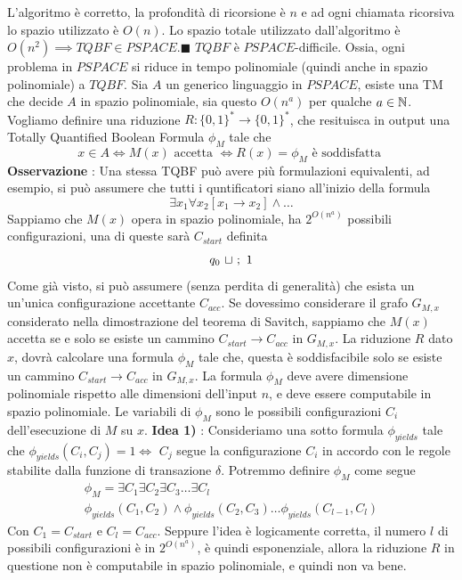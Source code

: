 \documentclass[10pt, letterpaper]{report}
\begin{document}
L'algoritmo è corretto, la profondità di ricorsione è $n$ e ad ogni chiamata ricorsiva lo spazio utilizzato è $O(n)$. Lo spazio totale utilizzato dall'algoritmo è $O(n^2)\implies TQBF\in PSPACE$.\hfill$\blacksquare$\acc 
\teo{} $TQBF$ è $PSPACE$-difficile. Ossia, ogni problema in $PSPACE$ si riduce in tempo polinomiale (quindi anche in spazio polinomiale) a $TQBF$.\acc 
\dimo{} Sia $A$ un generico linguaggio in $PSPACE$, esiste una TM che decide $A$ in spazio polinomiale, sia questo $O(n^a)$ per qualche $a\in {\mathbb N}$. Vogliamo definire una riduzione $R : \{0,1\}^*\rightarrow \{0,1\}^*$, che resituisca in output una Totally Quantified Boolean Formula $\phi_M$ tale che 
$$ x\in A \iff M(x)\text{ accetta }\iff R(x)=\phi_M \text{ è soddisfatta }$$
\textbf{Osservazione} : Una stessa TQBF può avere più formulazioni equivalenti, ad esempio, si può assumere che tutti i quntificatori siano all'inizio della formula 
$$ \exists x_1 \forall x_2 [x_1\rightarrow x_2]\land \dots$$
Sappiamo che $M(x)$ opera in spazio polinomiale, ha $2^{O(n^a)}$ possibili configurazioni, una di queste sarà $C_{start}$ definita $$ q_0 \ {\sqcup} \ ; \  1$$
Come già visto, si può assumere (senza perdita di generalità) che esista un un'unica configurazione accettante $C_{acc}$.\acc 
Se dovessimo considerare il grafo $G_{M,x}$ considerato nella dimostrazione del teorema di Savitch, sappiamo che $M(x)$ accetta se e solo se esiste un cammino $C_{start}\longrightarrow C_{acc}$ in $G_{M,x}$.\acc 
La riduzione $R$ dato $x$, dovrà calcolare una formula $\phi_M$ tale che, questa è soddisfacibile solo se esiste un cammino $C_{start}\longrightarrow C_{acc}$ in $G_{M,x}$. La formula $\phi_M$ deve avere dimensione polinomiale rispetto alle dimensioni dell'input $n$, e deve essere computabile in spazio polinomiale.\acc 
Le variabili di $\phi_M$ sono le possibili configurazioni $C_i$ dell'esecuzione di $M$ su $x$.\acc 
\textbf{Idea 1)} : Consideriamo una sotto formula $\phi_{yields}$ tale che  $\phi_{yields}(C_i,C_j)=1\iff$ $C_j$ segue la configurazione $C_i$ in accordo con le regole stabilite dalla funzione di transazione $\delta$. Potremmo definire $\phi_M$ come segue 
$$ \begin{matrix}
    \phi_M=\exists C_1\exists C_2\exists C_3 \dots \exists C_l\\ 
    \phi_{yields}(C_1,C_2)\land\phi_{yields}(C_2,C_3)\dots \phi_{yields}(C_{l-1},C_l)
\end{matrix}$$
Con $C_1=C_{start}$ e $C_l=C_{acc}$. Seppure l'idea è logicamente corretta, il numero $l$ di possibili configurazioni è in $2^{O(n^a)}$, è quindi esponenziale, allora la riduzione $R$ in questione non è computabile in spazio polinomiale, e quindi non va bene.\acc
\end{document}
